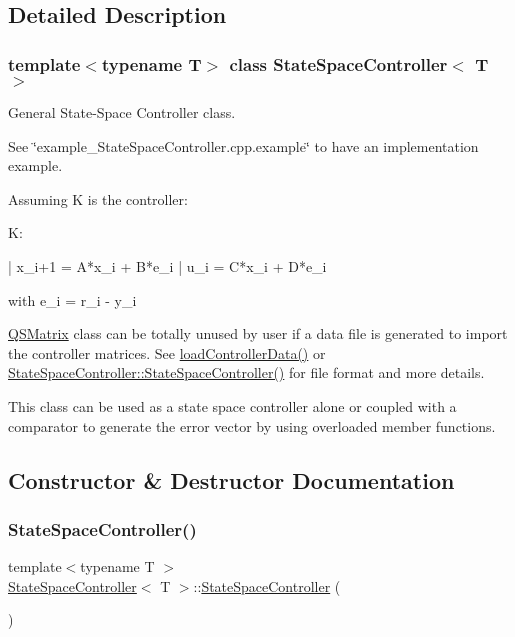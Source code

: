 \subsection{Detailed Description}
\subsubsection*{template$<$typename T$>$\newline
class State\+Space\+Controller$<$ T $>$}

General State-\/\+Space Controller class. 

See \char`\"{}example\+\_\+\+State\+Space\+Controller.\+cpp.\+example\char`\"{} to have an implementation example.

Assuming K is the controller\+: \begin{DoxyVerb} K:

     | x_{i+1} = A*x_i + B*e_i
     |     u_i = C*x_i + D*e_i

         with e_i = r_i - y_i  
\end{DoxyVerb}


\hyperlink{classQSMatrix}{Q\+S\+Matrix} class can be totally unused by user if a data file is generated to import the controller matrices. See \hyperlink{classStateSpaceController_a6884754d53bc98c247ac4dd1f39be2ec}{load\+Controller\+Data()} or \hyperlink{classStateSpaceController_aa44a3db59ff8e25bd03d9242356a6f10}{State\+Space\+Controller\+::\+State\+Space\+Controller()} for file format and more details.

This class can be used as a state space controller alone or coupled with a comparator to generate the error vector by using overloaded member functions. 

\subsection{Constructor \& Destructor Documentation}
\mbox{\label{classStateSpaceController_aa44a3db59ff8e25bd03d9242356a6f10}} 
\subsubsection{\texorpdfstring{State\+Space\+Controller()}{StateSpaceController()}\hspace{0.1cm}{\footnotesize\ttfamily [1/4]}}
{\footnotesize\ttfamily template$<$typename T $>$ \\
\hyperlink{classStateSpaceController}{State\+Space\+Controller}$<$ T $>$\+::\hyperlink{classStateSpaceController}{State\+Space\+Controller} (\begin{DoxyParamCaption}{ }\end{DoxyParamCaption})}



